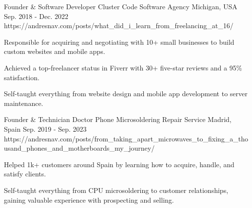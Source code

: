 

\begin{cventries}

	\cventry
	{Founder \& Software Developer} %
	{Cluster Code} %
	{Software Agency} %
	{Michigan, USA} %
	{Sep. 2018 - Dec. 2022} %
	{https://andresnav.com/posts/what_did_i_learn_from_freelancing_at_16/} %
	{
		\begin{cvitems} %
			\item {Responsible for acquiring and negotiating with 10+ small businesses to build custom websites and mobile apps.}
			\item {Achieved a top-freelancer status in Fiverr with 30+ five-star reviews and a 95\% satisfaction.}
			\item {Self-taught everything from website design and mobile app development to server maintenance.}
		\end{cvitems}
	}

	\cventry
	{Founder \& Technician} %
	{Doctor Phone} %
	{Microsoldering Repair Service} %
	{Madrid, Spain} %
	{Sep. 2019 - Sep. 2023} %
	{https://andresnav.com/posts/from_taking_apart_microwaves_to_fixing_a_thousand_phones_and_motherboards_my_journey/} %
	{
		\begin{cvitems} %
			\item {Helped 1k+ customers around Spain by learning how to acquire, handle, and satisfy clients.}
			\item {Self-taught everything from CPU microsoldering to customer relationships, gaining valuable experience with prospecting and selling.}
		\end{cvitems}
	}

\end{cventries}
